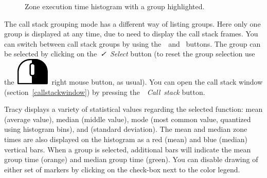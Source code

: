 \documentclass[hidelinks,titlepage,a4paper]{article}
\newcommand{\RMB}{\includegraphics[height=.8\baselineskip]{icons/rmb}}
\begin{document}
\begin{figure}[h]
\centering{}
\caption{Zone execution time histogram with a group highlighted.}
\label{findzonehistogramgroup}
\end{figure}

The call stack grouping mode has a different way of listing groups. Here only one group is displayed at any time, due to need to display the call stack frames. You can switch between call stack groups by using the~\faCaretLeft{}~and~\faCaretRight{} buttons. The group can be selected by clicking on the~\emph{\faCheck{}~Select} button (to reset the group selection use the~\RMB{}~right mouse button, as usual). You can open the call stack window (section~\ref{callstackwindow}) by pressing the~\emph{\faAlignJustify{}~Call~stack} button.

Tracy displays a variety of statistical values regarding the selected function: mean (average value), median (middle value), mode (most common value, quantized using histogram bins), and \textsigma{} (standard deviation). The mean and median zone times are also displayed on the histogram as a red (mean) and blue (median) vertical bars. When a group is selected, additional bars will indicate the mean group time (orange) and median group time (green). You can disable drawing of either set of markers by clicking on the check-box next to the color legend.
\end{document}
